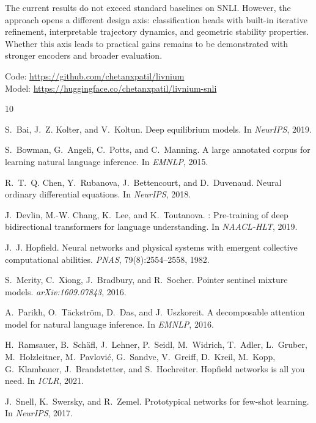\documentclass[11pt]{article}
\begin{document}
The current results do not exceed standard baselines on SNLI. However,
the approach opens a different design axis: classification heads with
built-in iterative refinement, interpretable trajectory dynamics, and
geometric stability properties. Whether this axis leads to practical
gains remains to be demonstrated with stronger encoders and broader
evaluation.

Code: \url{https://github.com/chetanxpatil/livnium} \\
Model: \url{https://huggingface.co/chetanxpatil/livnium-snli}


\begin{thebibliography}{10}

S.~Bai, J.~Z. Kolter, and V.~Koltun.
\newblock Deep equilibrium models.
\newblock In \emph{NeurIPS}, 2019.

S.~Bowman, G.~Angeli, C.~Potts, and C.~Manning.
\newblock A large annotated corpus for learning natural language inference.
\newblock In \emph{EMNLP}, 2015.

R.~T.~Q. Chen, Y.~Rubanova, J.~Bettencourt, and D.~Duvenaud.
\newblock Neural ordinary differential equations.
\newblock In \emph{NeurIPS}, 2018.

J.~Devlin, M.-W. Chang, K.~Lee, and K.~Toutanova.
: Pre-training of deep bidirectional transformers for
  language understanding.
\newblock In \emph{NAACL-HLT}, 2019.

J.~J. Hopfield.
\newblock Neural networks and physical systems with emergent collective
  computational abilities.
\newblock \emph{PNAS}, 79(8):2554--2558, 1982.

S.~Merity, C.~Xiong, J.~Bradbury, and R.~Socher.
\newblock Pointer sentinel mixture models.
\newblock \emph{arXiv:1609.07843}, 2016.

A.~Parikh, O.~T{\"a}ckstr{\"o}m, D.~Das, and J.~Uszkoreit.
\newblock A decomposable attention model for natural language inference.
\newblock In \emph{EMNLP}, 2016.

H.~Ramsauer, B.~Sch{\"a}fl, J.~Lehner, P.~Seidl, M.~Widrich,
  T.~Adler, L.~Gruber, M.~Holzleitner, M.~Pavlovi{\'c}, G.~Sandve,
  V.~Greiff, D.~Kreil, M.~Kopp, G.~Klambauer, J.~Brandstetter,
  and S.~Hochreiter.
\newblock Hopfield networks is all you need.
\newblock In \emph{ICLR}, 2021.

J.~Snell, K.~Swersky, and R.~Zemel.
\newblock Prototypical networks for few-shot learning.
\newblock In \emph{NeurIPS}, 2017.

\end{thebibliography}
\end{document}
